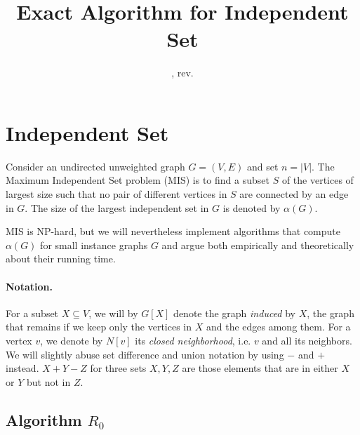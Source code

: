 \documentclass{tufte-handout}
\title{\sf Exact Algorithm for Independent Set}
\date{\GITAuthorDate, rev. \GITAbrHash}
\author{}
\begin{document}
\maketitle

\section{Independent Set}
Consider an undirected unweighted graph $G=(V,E)$ and set $n=|V|$.
The Maximum Independent Set problem (MIS) is to find a subset $S$ of
the vertices of largest size such that no pair of different vertices
in $S$ are connected by an edge in $G$.
The size of the largest independent set in $G$ is denoted by
$\alpha(G)$.

MIS is NP-hard, but we will nevertheless implement algorithms that
compute $\alpha(G)$ for small instance graphs $G$ and argue both
empirically and theoretically about their running time.

\paragraph{Notation.}
For a subset $X\subseteq V$, we will by $G[X]$ denote the graph
\emph{induced} by $X$, the graph that remains if we keep only the
vertices in $X$ and the edges among them.
For a vertex $v$, we denote by $N[v]$ its \emph{closed neighborhood},
i.e. $v$ and all its neighbors.
We will slightly abuse set difference and union notation by using $-$
and $+$ instead.
$X+Y-Z$ for three sets $X,Y,Z$ are those elements that are in either
$X$ or $Y$ but not in $Z$.


\subsection{Algorithm $R_0$}
\end{document}
